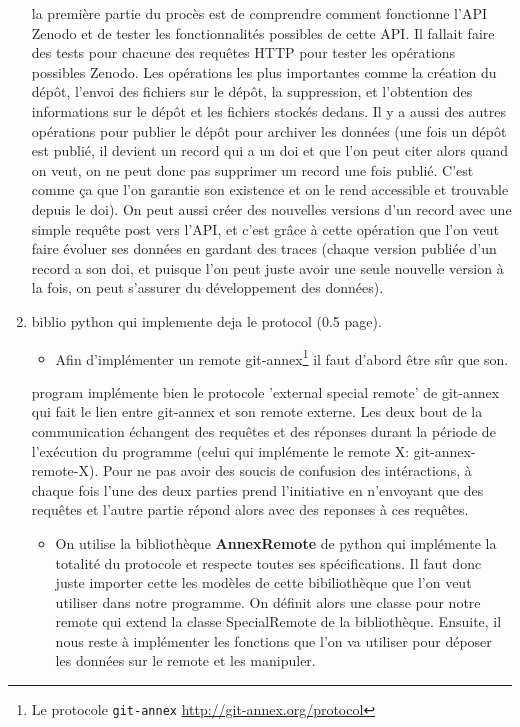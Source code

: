 \documentclass[11pt]{article}
\begin{document}
\begin{enumerate}
la première partie du procès est de comprendre comment fonctionne
l'API Zenodo et de tester les fonctionnalités possibles de cette
API. Il fallait faire des tests pour chacune des requêtes HTTP pour
tester les opérations possibles Zenodo. Les opérations les plus
importantes comme la création du dépôt, l'envoi des fichiers sur le
dépôt, la suppression, et l'obtention des informations sur le dépôt et
les fichiers stockés dedans. Il y a aussi des autres opérations pour
publier le dépôt pour archiver les données (une fois un dépôt est
publié, il devient un record qui a un doi et que l'on peut citer alors
quand on veut, on ne peut donc pas supprimer un record une fois
publié. C'est comme ça que l'on garantie son existence et on le rend
accessible et trouvable depuis le doi). On peut aussi créer des
nouvelles versions d'un record avec une simple requête post vers
l'API, et c'est grâce à cette opération que l'on veut faire évoluer
ses données en gardant des traces (chaque version publiée d'un record
a son doi, et puisque l'on peut juste avoir une seule nouvelle version
à la fois, on peut s'assurer du développement des données).
\item biblio python qui implemente deja le protocol (0.5 page).
\label{sec:org091e491}
\begin{itemize}
\item Afin d'implémenter un remote git-annex\footnote{Le protocole \texttt{git-annex} \url{http://git-annex.org/protocol}} il
faut d'abord être sûr que son. \cite{zenodo}
\end{itemize}
program implémente bien le protocole 'external special remote' de
git-annex qui fait le lien entre git-annex et son remote externe. Les
deux bout de la communication échangent des requêtes et des réponses
durant la période de l'exécution du programme
(celui qui implémente le remote X: git-annex-remote-X). Pour ne pas
avoir des soucis de confusion des intéractions, à chaque fois l'une des
deux parties prend l'initiative en n'envoyant que des requêtes et
l'autre partie répond alors avec des reponses à ces requêtes.
\begin{itemize}
\item On utilise la bibliothèque \textbf{AnnexRemote} de python qui implémente la
totalité du protocole et respecte toutes ses spécifications. Il faut
donc juste importer cette les modèles de cette bibiliothèque que
l'on veut utiliser dans notre programme. On définit alors une classe
pour notre remote qui extend la classe SpecialRemote de la
bibliothèque. Ensuite, il nous reste à implémenter les fonctions que
l'on va utiliser pour déposer les données sur le remote et les
manipuler.
\end{itemize}


\end{enumerate}
\end{document}
